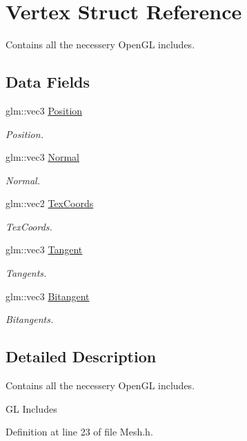 \hypertarget{struct_vertex}{}\section{Vertex Struct Reference}
\label{struct_vertex}


Contains all the necessery Open\+GL includes.  


\subsection*{Data Fields}
\begin{DoxyCompactItemize}
\item 
glm\+::vec3 \hyperlink{struct_vertex_abb3cfacd96b5955b0cec9359840ee49f}{Position}\hypertarget{struct_vertex_abb3cfacd96b5955b0cec9359840ee49f}{}\label{struct_vertex_abb3cfacd96b5955b0cec9359840ee49f}

\begin{DoxyCompactList}\small\item\em Position. \end{DoxyCompactList}\item 
glm\+::vec3 \hyperlink{struct_vertex_a9ab4dc431b41509f0b1bb1a4bf09d4e2}{Normal}\hypertarget{struct_vertex_a9ab4dc431b41509f0b1bb1a4bf09d4e2}{}\label{struct_vertex_a9ab4dc431b41509f0b1bb1a4bf09d4e2}

\begin{DoxyCompactList}\small\item\em Normal. \end{DoxyCompactList}\item 
glm\+::vec2 \hyperlink{struct_vertex_a921a513c1e6d1e63e99d477fa837a317}{Tex\+Coords}\hypertarget{struct_vertex_a921a513c1e6d1e63e99d477fa837a317}{}\label{struct_vertex_a921a513c1e6d1e63e99d477fa837a317}

\begin{DoxyCompactList}\small\item\em Tex\+Coords. \end{DoxyCompactList}\item 
glm\+::vec3 \hyperlink{struct_vertex_abfd8917796f41a3bd16441b2626e8212}{Tangent}\hypertarget{struct_vertex_abfd8917796f41a3bd16441b2626e8212}{}\label{struct_vertex_abfd8917796f41a3bd16441b2626e8212}

\begin{DoxyCompactList}\small\item\em Tangents. \end{DoxyCompactList}\item 
glm\+::vec3 \hyperlink{struct_vertex_af65a7edcbe784e73e9fb29fdf6368615}{Bitangent}\hypertarget{struct_vertex_af65a7edcbe784e73e9fb29fdf6368615}{}\label{struct_vertex_af65a7edcbe784e73e9fb29fdf6368615}

\begin{DoxyCompactList}\small\item\em Bitangents. \end{DoxyCompactList}\end{DoxyCompactItemize}


\subsection{Detailed Description}
Contains all the necessery Open\+GL includes. 

GL Includes 

Definition at line 23 of file Mesh.\+h.

